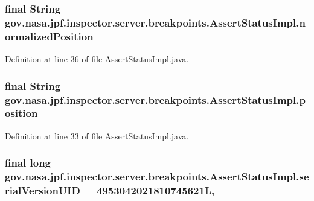 \subsubsection[{\texorpdfstring{normalized\+Position}{normalizedPosition}}]{\setlength{\rightskip}{0pt plus 5cm}final String gov.\+nasa.\+jpf.\+inspector.\+server.\+breakpoints.\+Assert\+Status\+Impl.\+normalized\+Position\hspace{0.3cm}{\ttfamily [private]}}\hypertarget{classgov_1_1nasa_1_1jpf_1_1inspector_1_1server_1_1breakpoints_1_1_assert_status_impl_a03dc67a974cdd18f1ca9d3975b0ad0df}{}\label{classgov_1_1nasa_1_1jpf_1_1inspector_1_1server_1_1breakpoints_1_1_assert_status_impl_a03dc67a974cdd18f1ca9d3975b0ad0df}


Definition at line 36 of file Assert\+Status\+Impl.\+java.

\subsubsection[{\texorpdfstring{position}{position}}]{\setlength{\rightskip}{0pt plus 5cm}final String gov.\+nasa.\+jpf.\+inspector.\+server.\+breakpoints.\+Assert\+Status\+Impl.\+position\hspace{0.3cm}{\ttfamily [private]}}\hypertarget{classgov_1_1nasa_1_1jpf_1_1inspector_1_1server_1_1breakpoints_1_1_assert_status_impl_a9da5ea3a1a030a104a9f85a8117b0cc2}{}\label{classgov_1_1nasa_1_1jpf_1_1inspector_1_1server_1_1breakpoints_1_1_assert_status_impl_a9da5ea3a1a030a104a9f85a8117b0cc2}


Definition at line 33 of file Assert\+Status\+Impl.\+java.

\subsubsection[{\texorpdfstring{serial\+Version\+U\+ID}{serialVersionUID}}]{\setlength{\rightskip}{0pt plus 5cm}final long gov.\+nasa.\+jpf.\+inspector.\+server.\+breakpoints.\+Assert\+Status\+Impl.\+serial\+Version\+U\+ID = 4953042021810745621L\hspace{0.3cm}{\ttfamily [static]}, {\ttfamily [private]}}\hypertarget{classgov_1_1nasa_1_1jpf_1_1inspector_1_1server_1_1breakpoints_1_1_assert_status_impl_a7be250aed4cc843648238a13d15efced}{}\label{classgov_1_1nasa_1_1jpf_1_1inspector_1_1server_1_1breakpoints_1_1_assert_status_impl_a7be250aed4cc843648238a13d15efced}


